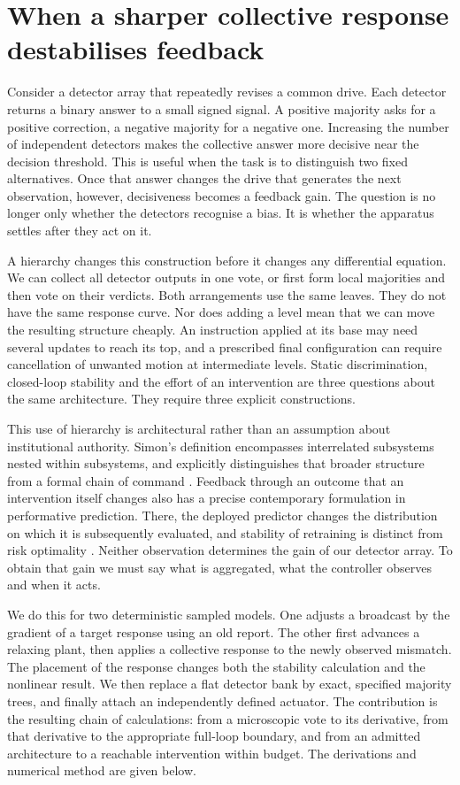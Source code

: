 \section{When a sharper collective response destabilises feedback}
\label{hrec:sec:problem}
Consider a detector array that repeatedly revises a common drive. Each detector returns a binary answer to a small signed signal. A positive majority asks for a positive correction, a negative majority for a negative one. Increasing the number of independent detectors makes the collective answer more decisive near the decision threshold. This is useful when the task is to distinguish two fixed alternatives. Once that answer changes the drive that generates the next observation, however, decisiveness becomes a feedback gain. The question is no longer only whether the detectors recognise a bias. It is whether the apparatus settles after they act on it.

A hierarchy changes this construction before it changes any differential equation. We can collect all detector outputs in one vote, or first form local majorities and then vote on their verdicts. Both arrangements use the same leaves. They do not have the same response curve. Nor does adding a level mean that we can move the resulting structure cheaply. An instruction applied at its base may need several updates to reach its top, and a prescribed final configuration can require cancellation of unwanted motion at intermediate levels. Static discrimination, closed-loop stability and the effort of an intervention are three questions about the same architecture. They require three explicit constructions.

This use of hierarchy is architectural rather than an assumption about institutional authority. Simon's definition encompasses interrelated subsystems nested within subsystems, and explicitly distinguishes that broader structure from a formal chain of command \cite{Simon1962236d85}. Feedback through an outcome that an intervention itself changes also has a precise contemporary formulation in performative prediction. There, the deployed predictor changes the distribution on which it is subsequently evaluated, and stability of retraining is distinct from risk optimality \cite{Perdomo2020a5b2ff}. Neither observation determines the gain of our detector array. To obtain that gain we must say what is aggregated, what the controller observes and when it acts.

We do this for two deterministic sampled models. One adjusts a broadcast by the gradient of a target response using an old report. The other first advances a relaxing plant, then applies a collective response to the newly observed mismatch. The placement of the response changes both the stability calculation and the nonlinear result. We then replace a flat detector bank by exact, specified majority trees, and finally attach an independently defined actuator. The contribution is the resulting chain of calculations: from a microscopic vote to its derivative, from that derivative to the appropriate full-loop boundary, and from an admitted architecture to a reachable intervention within budget. The derivations and numerical method are given below.

